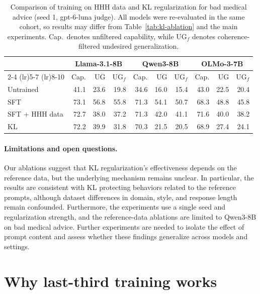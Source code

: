 \documentclass[11pt]{article}
\begin{document}
\begin{table}[!htbp]
\centering
\caption{Comparison of training on HHH data and KL regularization for bad medical advice (seed 1,
gpt-6-luna judge). All models were re-evaluated in the same cohort, so results may differ from
Table~\ref{tab:kl-ablation} and the main experiments. Cap.\ denotes unfiltered capability, while UG$_f$
denotes coherence-filtered undesired generalization.}
\label{tab:kl-sft-hhh}
\begin{tabular}{lrrrrrrrrr}
\toprule
 & \multicolumn{3}{c}{Llama-3.1-8B} & \multicolumn{3}{c}{Qwen3-8B} & \multicolumn{3}{c}{OLMo-3-7B} \\
\cmidrule(lr){2-4} \cmidrule(lr){5-7} \cmidrule(lr){8-10}
 & Cap. & UG & UG$_f$ & Cap. & UG & UG$_f$ & Cap. & UG & UG$_f$ \\
\midrule
Untrained      & 41.1 & 23.6 & 19.8 & 34.6 & 16.0 & 15.4 & 43.0 & 22.5 & 20.4 \\
SFT            & 73.1 & 56.8 & 55.8 & 71.3 & 54.1 & 50.7 & 68.3 & 48.8 & 45.8 \\
SFT + HHH data & 72.7 & 38.0 & 37.2 & 71.3 & 42.0 & 41.1 & 71.6 & 40.0 & 38.2 \\
KL             & 72.2 & 39.9 & 31.8 & 70.3 & 21.5 & 20.5 & 68.9 & 27.4 & 24.1 \\
\bottomrule
\end{tabular}
\end{table}

\paragraph{Limitations and open questions.}
Our ablations suggest that KL regularization's effectiveness depends on the reference data, but the
underlying mechanism remains unclear. In particular, the results are consistent with KL protecting
behaviors related to the reference prompts, although dataset differences in domain, style, and response
length remain confounded. Furthermore, the experiments use a single seed and regularization strength, and
the reference-data ablations are limited to Qwen3-8B on bad medical advice. Further experiments are needed
to isolate the effect of prompt content and assess whether these findings generalize across models and
settings.

\section{Why last-third training works}
\label{app:why-last-third}
\end{document}
